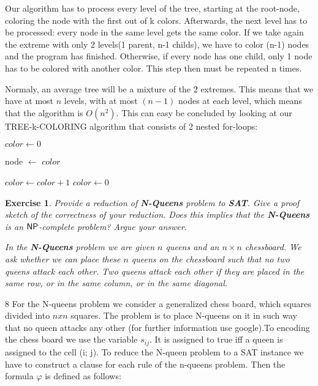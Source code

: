 \documentclass [11pt]{article}
\newtheorem{exercise}[theorem]{Exercise}
\renewcommand{\phi}{\varphi}
\newcommand{\ccfont}[1]{\protect\mathsf{#1}}
\newcommand{\NP}{\ccfont{NP}}
\newcommand{\solution}[1]{\noindent {\bf Solution.}  #1}
\begin{document}
Our algorithm has to process every level of the tree, starting at the root-node, coloring the node with the first out of k colors. Afterwards, the next level has to be processed: every node in the same level gets the same color. If we take again the extreme with only 2 levels(1 parent, n-1 childs), we have to color (n-1) nodes and the program has finished. Otherwise, if every node has one child, only 1 node has to be colored with another color. This step then must be repeated n times.

Normaly, an average tree will be a mixture of the 2 extremes. This means that we have at most $n$ levels, with at most $(n-1)$ nodes at each level, which means that the algorithm is $O(n^2)$. This can easy be concluded by looking at our TREE-k-COLORING algorithm that consists of 2 nested for-loops:

\medskip

\begin{algorithmic}
  \State $color\gets 0$
  
   \State node $\gets$ $color$
 
\EndFor
        \State $color\gets color+1$
    \Else
            \State $color\gets 0$
    \EndIf
\EndFor
\EndFunction
\end{algorithmic}


\begin{exercise}
  \label{ex:Nqueens}
  Provide a reduction of \textbf{N-Queens} problem to \textbf{SAT}. Give a proof sketch of the correctness of your reduction. Does this implies that the \textbf{N-Queens} is an $\NP$-complete problem? Argue your answer.  
  
  \smallskip 
  
\noindent In the \textbf{N-Queens} problem we are given $n$ queens and an $n \times n$ chessboard. We ask whether we can place these $n$ queens on the  chessboard such that no two queens attack each other. Two queens attack each other if they are placed in the same row, or in the same column, or in the same diagonal.    
       
   
\end{exercise}


\solution{ 8}
For the  N-queens problem we consider  a generalized chess board, which squares divided into $n x n$  squares. The problem is to place N-queens on it in such way that no queen attacks any other (for further information use google).To encoding the chess board we use the variable $s_{ij}$. It  is assigned to true iff a queen is assigned to the cell (i; j).  To reduce the N-queen problem to a SAT instance we have to construct a clause for each rule of the n-queens problem. Then the formula $ \phi$ is defined as follows:
\end{document}
